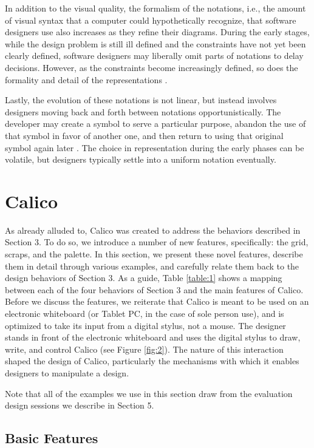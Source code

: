 In addition to the visual quality, the formalism of the notations, i.e., the amount of visual syntax that a computer could hypothetically recognize, that software designers use also increases as they refine their diagrams. During the early stages, while the design problem is still ill defined and the constraints have not yet been clearly defined, software designers may liberally omit parts of notations to delay decisions. However, as the constraints become increasingly defined, so does the formality and detail of the representations \citep{ossher12flexible}. 

Lastly, the evolution of these notations is not linear, but instead involves designers moving back and forth between notations opportunistically. The developer may create a symbol to serve a particular purpose, abandon the use of that symbol in favor of another one, and then return to using that original symbol again later \citep{dekel2007notation}. The choice in representation during the early phases can be volatile, but designers typically settle into a uniform notation eventually.

\section{Calico}
\label{calico}
As already alluded to, Calico was created to address the behaviors described in Section 3. To do so, we introduce a number of new features, specifically: the grid, scraps, and the palette. In this section, we present these novel features, describe them in detail through various examples, and carefully relate them back to the design behaviors of Section 3. As a guide, Table \ref{table:1} shows a mapping between each of the four behaviors of Section 3 and the main features of Calico.
Before we discuss the features, we reiterate that Calico is meant to be used on an electronic whiteboard (or Tablet PC, in the case of sole person use), and is optimized to take its input from a digital stylus, not a mouse. The designer stands in front of the electronic whiteboard and uses the digital stylus to draw, write, and control Calico (see Figure \ref{fig:2}). The nature of this interaction shaped the design of Calico, particularly the mechanisms with which it enables designers to manipulate a design.

Note that all of the examples we use in this section draw from the evaluation design sessions we describe in Section 5.

\subsection {Basic Features}
\label{calico:1}

